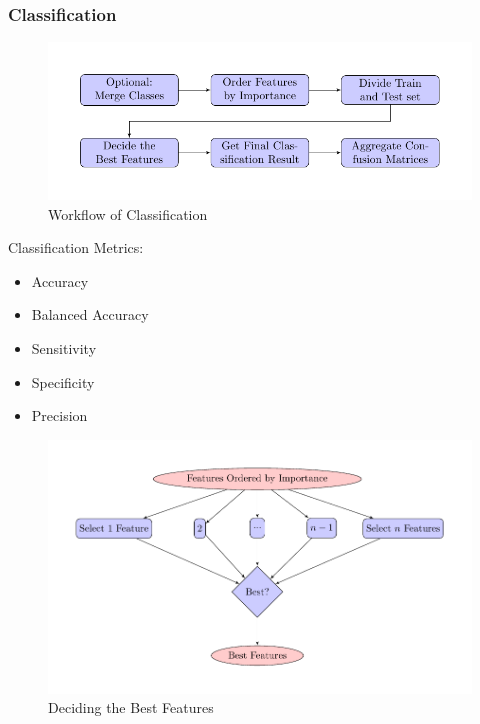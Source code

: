 \documentclass{beamer}
\begin{document}
    \begin{frame}[allowframebreaks]
        \frametitle{Classification}

        \begin{figure}
            \includegraphics[width=0.5 \linewidth]{figures/Classifier/classifier.pdf}
            \caption{Workflow of Classification}
        \end{figure}

        Classification Metrics:
        \begin{itemize}
            \item Accuracy
            \item Balanced Accuracy
            \item Sensitivity
            \item Specificity
            \item Precision
        \end{itemize}

        \begin{figure}
            \includegraphics[width=0.8 \linewidth]{figures/Classifier/best.pdf}
            \caption{Deciding the Best Features}
        \end{figure}
    \end{frame}
\end{document}
